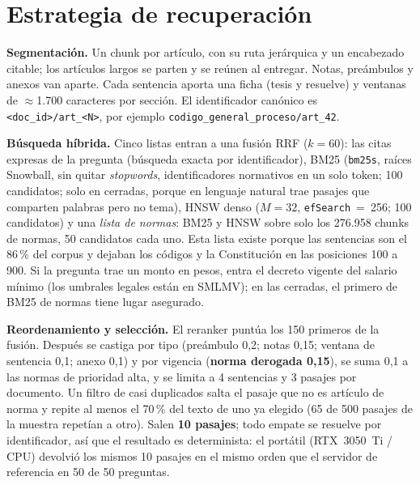 \documentclass[10pt,twocolumn,letterpaper]{article}
\newcommand{\cod}[1]{\texttt{#1}}
\begin{document}
\section{Estrategia de recuperación}

\textbf{Segmentación.} Un chunk por artículo, con su ruta jerárquica y un encabezado
citable; los artículos largos se parten y se reúnen al entregar. Notas, preámbulos y
anexos van aparte. Cada sentencia aporta una ficha (tesis y resuelve) y ventanas de
$\approx$1.700 caracteres por sección. El identificador canónico es
\cod{<doc\_id>/art\_<N>}, por ejemplo \cod{codigo\_general\_proceso/art\_42}.

\textbf{Búsqueda híbrida.} Cinco listas entran a una fusión RRF ($k=60$): las citas
expresas de la pregunta (búsqueda exacta por identificador), BM25 (\cod{bm25s}, raíces
Snowball, sin quitar \emph{stopwords}, identificadores normativos en un solo token; 100
candidatos; solo en cerradas, porque en lenguaje natural trae pasajes que comparten
palabras pero no tema), HNSW denso ($M=32$, \cod{efSearch}~=~256; 100 candidatos) y una
\emph{lista de normas}: BM25 y HNSW sobre solo los 276.958 chunks de normas, 50
candidatos cada uno. Esta lista existe porque las sentencias son el 86\,\% del corpus y
dejaban los códigos y la Constitución en las posiciones 100 a 900. Si la pregunta trae
un monto en pesos, entra el decreto vigente del salario mínimo (los umbrales legales
están en SMLMV); en las cerradas, el primero de BM25 de normas tiene lugar asegurado.

\textbf{Reordenamiento y selección.} El reranker puntúa los 150 primeros de la fusión.
Después se castiga por tipo (preámbulo 0,2; notas 0,15; ventana de sentencia 0,1; anexo
0,1) y por vigencia (\textbf{norma derogada 0,15}), se suma 0,1 a las normas de
prioridad alta, y se limita a 4 sentencias y 3 pasajes por documento. Un filtro de
casi duplicados salta el pasaje que no es artículo de norma y repite al menos el 70\,\%
del texto de uno ya elegido (65 de 500 pasajes de la muestra repetían a otro). Salen
\textbf{10 pasajes}; todo empate se resuelve por identificador, así que el resultado es
determinista: el portátil (RTX~3050~Ti / CPU) devolvió los mismos 10 pasajes en el mismo
orden que el servidor de referencia en 50 de 50 preguntas.
\end{document}
